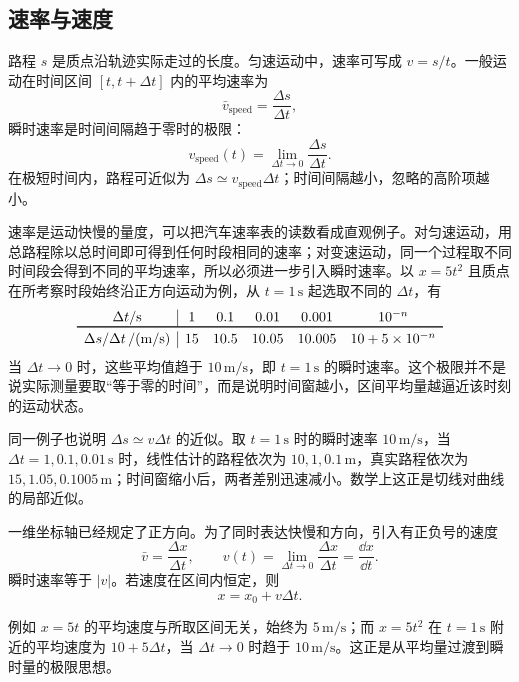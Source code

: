 {\subsection{速率与速度}

路程 $s$ 是质点沿轨迹实际走过的长度。匀速运动中，速率可写成 $v=s/t$。一般运动在时间区间 $[t,t+\Delta t]$ 内的平均速率为
\begin{equation}
  \bar v_{\mathrm{speed}}=\frac{\Delta s}{\Delta t},
\end{equation}
瞬时速率是时间间隔趋于零时的极限：
\begin{equation}
  v_{\mathrm{speed}}(t)=\lim_{\Delta t\to0}\frac{\Delta s}{\Delta t}.
\end{equation}
在极短时间内，路程可近似为 $\Delta s\simeq v_{\mathrm{speed}}\Delta t$；时间间隔越小，忽略的高阶项越小。

速率是运动快慢的量度，可以把汽车速率表的读数看成直观例子。对匀速运动，用总路程除以总时间即可得到任何时段相同的速率；对变速运动，同一个过程取不同时间段会得到不同的平均速率，所以必须进一步引入瞬时速率。以 $x=5t^2$ 且质点在所考察时段始终沿正方向运动为例，从 $t=1\,\mathrm{s}$ 起选取不同的 $\Delta t$，有
\[
\begin{array}{c|ccccc}
\Delta t/\mathrm s&1&0.1&0.01&0.001&10^{-n}\\\toprule
\Delta s/\Delta t\,/\mathrm{(m/s)}&15&10.5&10.05&10.005&10+5\times10^{-n}
\end{array}
\]
当 $\Delta t\to0$ 时，这些平均值趋于 $10\,\mathrm{m/s}$，即 $t=1\,\mathrm{s}$ 的瞬时速率。这个极限并不是说实际测量要取“等于零的时间”，而是说明时间窗越小，区间平均量越逼近该时刻的运动状态。

同一例子也说明 $\Delta s\simeq v\Delta t$ 的近似。取 $t=1\,\mathrm{s}$ 时的瞬时速率 $10\,\mathrm{m/s}$，当 $\Delta t=1,0.1,0.01\,\mathrm{s}$ 时，线性估计的路程依次为 $10,1,0.1\,\mathrm{m}$，真实路程依次为 $15,1.05,0.1005\,\mathrm{m}$；时间窗缩小后，两者差别迅速减小。数学上这正是切线对曲线的局部近似。

一维坐标轴已经规定了正方向。为了同时表达快慢和方向，引入有正负号的速度
\begin{equation}
  \bar v=\frac{\Delta x}{\Delta t},\qquad
  v(t)=\lim_{\Delta t\to0}\frac{\Delta x}{\Delta t}=\frac{\dd x}{\dd t}.
\end{equation}
瞬时速率等于 $|v|$。若速度在区间内恒定，则
\begin{equation}
  x=x_0+v\Delta t.
\end{equation}

例如 $x=5t$ 的平均速度与所取区间无关，始终为 $5\,\mathrm{m/s}$；而 $x=5t^2$ 在 $t=1\,\mathrm{s}$ 附近的平均速度为 $10+5\Delta t$，当 $\Delta t\to0$ 时趋于 $10\,\mathrm{m/s}$。这正是从平均量过渡到瞬时量的极限思想。

}
